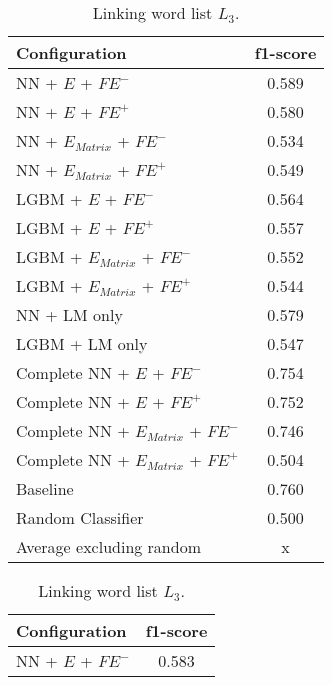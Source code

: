 \begin{table}[h]
  	\tiny
  	\centering
	\begin{subtable}{.5\textwidth}
		\centering
  		\renewcommand{\arraystretch}{1.4}
   		\begin{tabular}{|| l || c ||}
   			\hline
   			{Configuration} & {f1-score} \\
   			\hline\hline
   			NN + $E$ + $\textit{FE}^-$ &  0.589 \\
 			\hline
 			NN + $E$ + $\textit{FE}^+$ & 0.580 \\
 			\hline
 			NN + $E_{Matrix}$ + $\textit{FE}^-$ & 0.534 \\
 			\hline
 			NN + $E_{Matrix}$ + $\textit{FE}^+$ & 0.549 \\
 			\hline
 			LGBM + $E$ + $\textit{FE}^-$ & 0.564 \\
 			\hline
 			LGBM + $E$ + $\textit{FE}^+$ & 0.557 \\
 			\hline
 			LGBM + $E_{Matrix}$ + $\textit{FE}^-$ & 0.552 \\
 			\hline
 			LGBM + $E_{Matrix}$ + $\textit{FE}^+$ & 0.544 \\
 			\hline
 			NN + LM only & 0.579 \\
 			\hline
 			LGBM + LM only & 0.547 \\
 			\hline
 			Complete NN + $E$ + $\textit{FE}^-$ & 0.754 \\
 			\hline
 			Complete NN + $E$ + $\textit{FE}^+$ & 0.752 \\
 			\hline
 			Complete NN + $E_{Matrix}$ + $\textit{FE}^-$ & 0.746 \\
 			\hline
 			Complete NN + $E_{Matrix}$ + $\textit{FE}^+$ & 0.504 \\
 			\hline
 			Baseline & 0.760 \\
 			\hline
 			Random Classifier & 0.500 \\
 			\hline
 			\hline
 			Average excluding random & x \\
 			\hline
		\end{tabular}
		\renewcommand{\arraystretch}{1}
  		\caption{Linking word list $L_3$.}%
  	\end{subtable}%
  	\begin{subtable}{.5\textwidth}
		\centering
  		\renewcommand{\arraystretch}{1.4}
   		\begin{tabular}{|| l || c ||}
   			\hline
   			{Configuration} & {f1-score} \\
   			\hline\hline
   			NN + $E$ + $\textit{FE}^-$ &  0.583 \\

\end{tabular}
\end{subtable}
\end{table}
